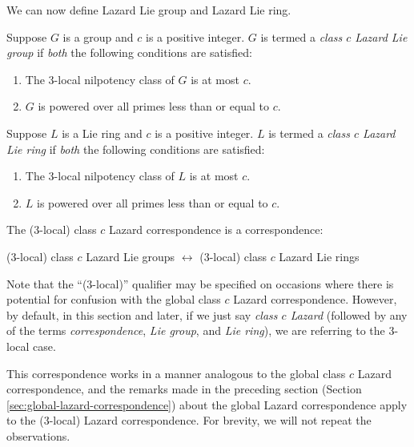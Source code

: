 We can now define Lazard Lie group and Lazard Lie ring.

\begin{definer}
  Suppose $G$ is a group and $c$ is a positive integer. $G$ is termed
  a {\em class $c$ Lazard Lie group} if {\em both} the following
  conditions are satisfied:

  \begin{enumerate}
  \item The $3$-local nilpotency class of $G$ is at most $c$.
  \item $G$ is powered over all primes less than or equal to $c$.
  \end{enumerate}
\end{definer}

\begin{definer}
  Suppose $L$ is a Lie ring and $c$ is a positive integer. $L$ is
  termed a {\em class $c$ Lazard Lie ring} if {\em both} the
  following conditions are satisfied:

  \begin{enumerate}
  \item The $3$-local nilpotency class of $L$ is at most $c$.
  \item $L$ is powered over all primes less than or equal to $c$.
  \end{enumerate}
\end{definer}

The ($3$-local) class $c$ Lazard correspondence is a correspondence:

\begin{center}
  ($3$-local) class $c$ Lazard Lie groups $\leftrightarrow$
  ($3$-local) class $c$ Lazard Lie rings
\end{center}

Note that the ``($3$-local)'' qualifier may be specified on occasions
where there is potential for confusion with the global class $c$
Lazard correspondence. However, by default, in this section and later,
if we just say {\em class $c$ Lazard} (followed by any of the terms
{\em correspondence}, {\em Lie group}, and {\em Lie ring}), we are
  referring to the $3$-local case.

This correspondence works in a manner analogous to the global class $c$ Lazard
correspondence, and the remarks made in the preceding section (Section
\ref{sec:global-lazard-correspondence}) about the global Lazard
correspondence apply to the ($3$-local) Lazard correspondence. For
brevity, we will not repeat the observations.

